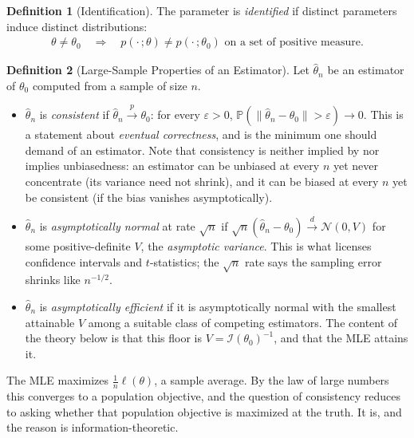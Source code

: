 \documentclass[11pt]{article}
\theoremstyle{definition}
\newtheorem{definition}{Definition}[section]
\theoremstyle{plain}
\theoremstyle{remark}
\begin{document}
\begin{definition}[Identification]
    The parameter is \emph{identified} if distinct parameters induce distinct distributions:
    \begin{align}
        \theta \neq \theta_0 \quad\Longrightarrow\quad p(\cdot\,;\theta) \neq p(\cdot\,;\theta_0) \text{ on a set of positive measure.}
    \end{align}
\end{definition}

\begin{definition}[Large-Sample Properties of an Estimator]
    Let $\hat{\theta}_n$ be an estimator of $\theta_0$ computed from a sample of size $n$.
    \begin{itemize}[noitemsep]
        \item $\hat{\theta}_n$ is \emph{consistent} if $\hat{\theta}_n \xrightarrow{p} \theta_0$: for every $\varepsilon > 0$, $\mathbb{P}(\|\hat{\theta}_n - \theta_0\| > \varepsilon) \to 0$. This is a statement about \emph{eventual correctness}, and is the minimum one should demand of an estimator. Note that consistency is neither implied by nor implies unbiasedness: an estimator can be unbiased at every $n$ yet never concentrate (its variance need not shrink), and it can be biased at every $n$ yet be consistent (if the bias vanishes asymptotically).
        \item $\hat{\theta}_n$ is \emph{asymptotically normal} at rate $\sqrt{n}$ if $\sqrt{n}(\hat{\theta}_n - \theta_0) \xrightarrow{d} \mathcal{N}(0, V)$ for some positive-definite $V$, the \emph{asymptotic variance}. This is what licenses confidence intervals and $t$-statistics; the $\sqrt{n}$ rate says the sampling error shrinks like $n^{-1/2}$.
        \item $\hat{\theta}_n$ is \emph{asymptotically efficient} if it is asymptotically normal with the smallest attainable $V$ among a suitable class of competing estimators. The content of the theory below is that this floor is $V = \mathcal{I}(\theta_0)^{-1}$, and that the MLE attains it.
    \end{itemize}
\end{definition}

The MLE maximizes $\frac{1}{n}\ell(\theta)$, a sample average. By the law of large numbers this converges to a population objective, and the question of consistency reduces to asking whether that population objective is maximized at the truth. It is, and the reason is information-theoretic.
\end{document}
